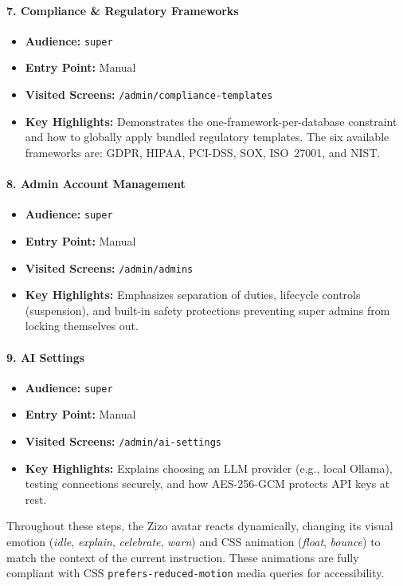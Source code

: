 \paragraph{7. Compliance \& Regulatory Frameworks}
\begin{itemize}
    \item \textbf{Audience:} \texttt{super}
    \item \textbf{Entry Point:} Manual
    \item \textbf{Visited Screens:} \texttt{/admin/compliance-templates}
    \item \textbf{Key Highlights:} Demonstrates the one-framework-per-database
          constraint and how to globally apply bundled regulatory templates.
          The six available frameworks are: GDPR, HIPAA, PCI-DSS, SOX,
          ISO~27001, and NIST.
\end{itemize}

\paragraph{8. Admin Account Management}
\begin{itemize}
    \item \textbf{Audience:} \texttt{super}
    \item \textbf{Entry Point:} Manual
    \item \textbf{Visited Screens:} \texttt{/admin/admins}
    \item \textbf{Key Highlights:} Emphasizes separation of duties, lifecycle controls (suspension), and built-in safety protections preventing super admins from locking themselves out.
\end{itemize}

\paragraph{9. AI Settings}
\begin{itemize}
    \item \textbf{Audience:} \texttt{super}
    \item \textbf{Entry Point:} Manual
    \item \textbf{Visited Screens:} \texttt{/admin/ai-settings}
    \item \textbf{Key Highlights:} Explains choosing an LLM provider (e.g., local Ollama), testing connections securely, and how AES-256-GCM protects API keys at rest.
\end{itemize}

Throughout these steps, the Zizo avatar reacts dynamically, changing its visual emotion (\emph{idle}, \emph{explain}, \emph{celebrate}, \emph{warn}) and CSS animation (\emph{float}, \emph{bounce}) to match the context of the current instruction. These animations are fully compliant with CSS \texttt{prefers-reduced-motion} media queries for accessibility.

